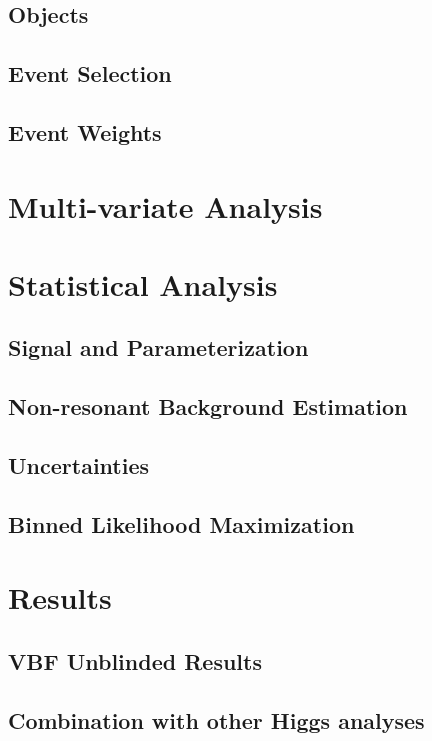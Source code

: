 \documentclass{report}
\begin{document}
\subsection{Objects}

\subsection{Event Selection}

\subsection{Event Weights}


\section{Multi-variate Analysis}


\section{Statistical Analysis}
\subsection{Signal and \zjets Parameterization}

\subsection{Non-resonant Background Estimation}

\subsection{Uncertainties}

\subsection{Binned Likelihood Maximization}

\section{Results}
\subsection{VBF Unblinded Results}

\subsection{Combination with other Higgs analyses}
%
\end{document}
